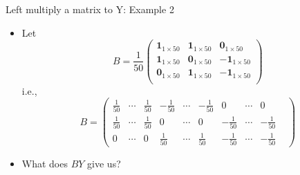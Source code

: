 \documentclass[
  ignorenonframetext,
]{beamer}
\begin{document}
\begin{frame}{Left multiply a matrix to Y: Example 2}
\protect\hypertarget{left-multiply-a-matrix-to-y-example-2}{}
\begin{itemize}
\item
  Let \[B=\frac{1}{50}\begin{pmatrix}
  \mathbf 1_{1\times 50} & \mathbf 1_{1\times 50} & \mathbf 0_{1\times 50}\\
  \mathbf 1_{1\times 50} & \mathbf 0_{1\times 50} & -\mathbf 1_{1\times 50} \\
  \mathbf 0_{1\times 50} & \mathbf 1_{1\times 50} & -\mathbf 1_{1\times 50} \\
  \end{pmatrix}\] i.e., \[B=\begin{pmatrix}
  \frac{1}{50}& \cdots& \frac{1}{50}&
  -\frac{1}{50}& \cdots& -\frac{1}{50}&
  0 & \cdots & 0\\
  \frac{1}{50}& \cdots& \frac{1}{50}&
  0 & \cdots & 0 &
  -\frac{1}{50}& \cdots& -\frac{1}{50}&\\
  0 & \cdots & 0 &
  \frac{1}{50}& \cdots& \frac{1}{50}&
  -\frac{1}{50}& \cdots& -\frac{1}{50}&
  \end{pmatrix}\]
\item
  What does \(BY\) give us?
\end{itemize}
\end{frame}
\end{document}
